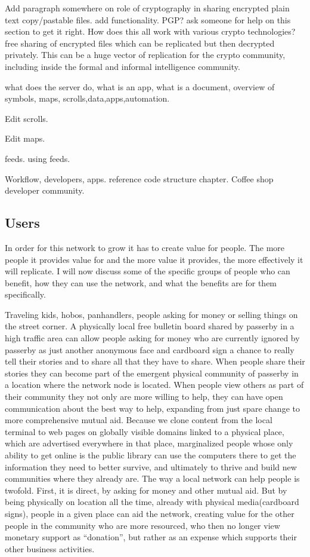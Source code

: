 Add paragraph somewhere on role of cryptography in sharing encrypted plain text copy/pastable files.  add functionality.  PGP?  ask someone for help on this section to get it right. How does this all work with various crypto technologies?  free sharing of encrypted files which can be replicated but then decrypted privately.  This can be a huge vector of replication for the crypto community, including inside the formal and informal intelligence community.  

what does the server do, what is an app, what is a document, overview of symbols, maps, scrolls,data,apps,automation.

Edit scrolls.

Edit maps.

feeds.  using feeds.

Workflow, developers, apps.  reference code structure chapter. Coffee shop developer community.


\subsection{Users}

In order for this network to grow it has to create value for people. The more people it provides value for and the more value it provides, the more effectively it will replicate.  I will now discuss some of the specific groups of people who can benefit, how they can use the network, and what the benefits are for them specifically.

Traveling kids, hobos, panhandlers, people asking for money or selling things on the street corner.  A physically local free bulletin board shared by passerby in a high traffic area can allow people asking for money who are currently ignored by passerby as just another anonymous face and cardboard sign a chance to really tell their stories and to share all that they have to share.  When people share their stories they can become part of the emergent physical community of passerby in a location where the network node is located.  When people view others as part of their community they not only are more willing to help, they can have open communication about the best way to help, expanding from just spare change to more comprehensive mutual aid.  Because we clone content from the local terminal to web pages on globally visible domains linked to a physical place, which are advertised everywhere in that place, marginalized people whose only ability to get online is the public library can use the computers there to get the information they need to better survive, and ultimately to thrive and build new communities where they already are.  The way a local network can help people is twofold. First, it is direct, by asking for money and other mutual aid.  But by being physically on location all the time, already with physical media(cardboard signs), people in a given place can aid the network, creating value for the other people in the community who are more resourced, who then no longer view monetary support as ``donation'', but rather as an expense which supports their other business activities.  

